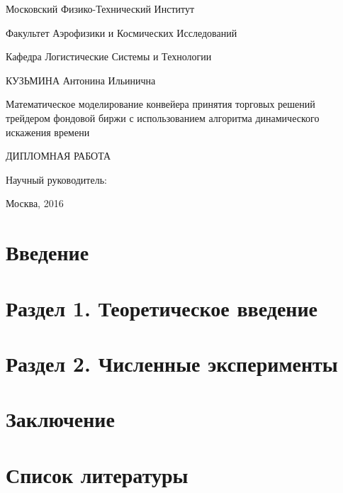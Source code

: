 \documentclass{article}
\begin{document}
\thispagestyle{empty}
\begin{center}
Московский Физико-Технический Институт

Факультет Аэрофизики и Космических Исследований

Кафедра Логистические Системы и Технологии

\parskip=100pt
КУЗЬМИНА Антонина Ильинична
\parskip=30pt

Математическое моделирование конвейера принятия торговых решений трейдером фондовой биржи с использованием алгоритма динамического искажения времени

ДИПЛОМНАЯ РАБОТА
\end{center}

\begin{flushright}
\parskip=50pt
Научный руководитель:
\end{flushright}

\vspace{\fill}
\begin{center}
Москва, 2016
\end{center}
\newpage{}
\tableofcontents{}
\newpage{}
\renewcommand\thesection{}
\renewcommand\thesubsection{}
\section{Введение}
\section{Раздел 1. Теоретическое введение}
\section{Раздел 2. Численные эксперименты}
\section{Заключение}
\section{Список литературы}
\end{document}
